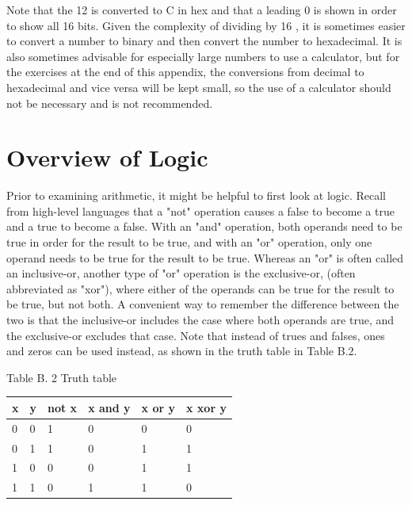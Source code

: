 \documentclass[10pt]{book}
\begin{document}
Note that the 12 is converted to C in hex and that a leading 0 is shown in order to show all 16 bits. Given the complexity of dividing by 16 , it is sometimes easier to convert a number to binary and then convert the number to hexadecimal. It is also sometimes advisable for especially large numbers to use a calculator, but for the exercises at the end of this appendix, the conversions from decimal to hexadecimal and vice versa will be kept small, so the use of a calculator should not be necessary and is not recommended.

\section{Overview of Logic}
Prior to examining arithmetic, it might be helpful to first look at logic. Recall from high-level languages that a "not" operation causes a false to become a true and a true to become a false. With an "and" operation, both operands need to be true in order for the result to be true, and with an "or" operation, only one operand needs to be true for the result to be true. Whereas an "or" is often called an inclusive-or, another type of "or" operation is the exclusive-or, (often abbreviated as "xor"), where either of the operands can be true for the result to be true, but not both. A convenient way to remember the difference between the two is that the inclusive-or includes the case where both operands are true, and the exclusive-or excludes that case. Note that instead of trues and falses, ones and zeros can be used instead, as shown in the truth table in Table B.2.

Table B. 2 Truth table

\begin{center}
\begin{tabular}{|l|l|l|l|l|l|}
\hline
x & y & not x & x and y & x or y & x xor y \\
\hline
0 & 0 & 1 & 0 & 0 & 0 \\
\hline
0 & 1 & 1 & 0 & 1 & 1 \\
\hline
1 & 0 & 0 & 0 & 1 & 1 \\
\hline
1 & 1 & 0 & 1 & 1 & 0 \\
\hline
\end{tabular}
\end{center}
\end{document}
